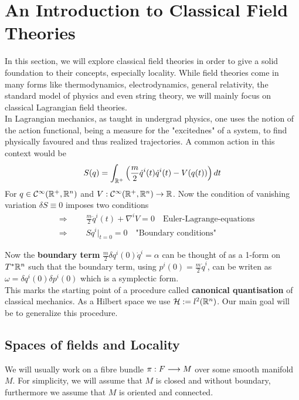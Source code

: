 \section{An Introduction to Classical Field Theories}
\label{sec:Classical_FT}
In this section, we will explore classical field theories  in order to give a solid foundation to their concepts, especially locality. While field theories come in many forms like thermodynamics, electrodynamics, general relativity, the standard model of physics and even string theory, we will mainly focus on classical Lagrangian field theories.\\

In Lagrangian mechanics, as taught in undergrad physics, one uses the notion of the action functional, being a measure for the "excitednes" of a system, to find physically favoured and thus realized trajectories. A common action in this context would be
$$ S(q) = \int_{\mathbb{R}^+} \left( \frac{m}{2} \dot q^i(t) \dot q^i(t) - V(q(t)) \right) dt $$
For $q\in \mathcal{C}^{\infty}(\mathbb{R}^+, \mathbb{R}^n)$ and $V:\mathcal{C}^{\infty}(\mathbb{R}^+, \mathbb{R}^n) \rightarrow \mathbb{R}$. Now the condition of vanishing variation $\delta S \equiv 0$ imposes two conditions
\begin{align*}
  &\Rightarrow \quad \quad \frac{m}{2} \ddot q^i(t) + \nabla^i V = 0 \quad \text{Euler-Lagrange-equations}\\
  &\Rightarrow \quad \quad S q^i \Big|_{t=0} = 0 \quad \text{"Boundary conditions"}
\end{align*}

Now the \textbf{boundary term} $\frac{m}{2}\delta q^i(0) \dot q^i = \alpha$ can be thought of as a 1-form on $T^*\mathbb{R}^n$ such that the boundary term, using $p^i(0) = \frac{m}{2} \dot q^i$, can be writen as $\omega = \delta q^i(0) \delta p^i(0)$ which is a symplectic form.\\

This marks the starting point of a procedure called \textbf{canonical quantisation} of classical mechanics. As a Hilbert space we use $\mathcal{H} := l^2(\mathbb{R}^n)$. Our main goal will be to generalize this procedure.\\

\subsection{Spaces of fields and Locality}
We will usually work on a fibre bundle $\pi: F \longrightarrow M$ over some smooth manifold $M$. For simplicity, we will assume that $M$ is closed and without boundary, furthermore we assume that $M$ is oriented and connected.

